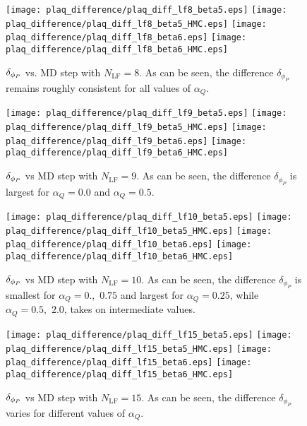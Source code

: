 \documentclass[../main.tex]{subfiles}
\begin{document}
%
\begin{figure}[htpb]\label{fig:plaq_diff_plots_lf8_beta5}
  \texttt{[image: plaq\_difference/plaq\_diff\_lf8\_beta5.eps]}
  \hfill
  \texttt{[image: plaq\_difference/plaq\_diff\_lf8\_beta5\_HMC.eps]}
  \texttt{[image: plaq\_difference/plaq\_diff\_lf8\_beta6.eps]}
  \hfill
  \texttt{[image: plaq\_difference/plaq\_diff\_lf8\_beta6\_HMC.eps]}
  \caption{${\delta_{\phi_{P}}}$ vs. MD step with $N_{\mathrm{LF}} = 8$. As can be seen, the difference $\delta_{\phi_{P}}$
    remains roughly consistent for all values of $\alpha_Q$.}
\end{figure}
%
\begin{figure}[htpb]\label{fig:plaq_diff_plots_lf9}
  \texttt{[image: plaq\_difference/plaq\_diff\_lf9\_beta5.eps]}
  \hfill
  \texttt{[image: plaq\_difference/plaq\_diff\_lf9\_beta5\_HMC.eps]}
  \texttt{[image: plaq\_difference/plaq\_diff\_lf9\_beta6.eps]}
  \hfill
  \texttt{[image: plaq\_difference/plaq\_diff\_lf9\_beta6\_HMC.eps]}
  \caption{${\delta_{\phi_{P}}}$ vs MD step with $N_{\mathrm{LF}} = 9$. As can be seen, the difference $\delta_{\phi_{P}}$ is
  largest for $\alpha_Q = 0.0$ and $\alpha_Q = 0.5$.}
\end{figure}
%
\begin{figure}[htpb]\label{fig:plaq_diff_plots_lf10}
  \texttt{[image: plaq\_difference/plaq\_diff\_lf10\_beta5.eps]}
  \hfill
  \texttt{[image: plaq\_difference/plaq\_diff\_lf10\_beta5\_HMC.eps]}
  \texttt{[image: plaq\_difference/plaq\_diff\_lf10\_beta6.eps]}
  \hfill
  \texttt{[image: plaq\_difference/plaq\_diff\_lf10\_beta6\_HMC.eps]}
  \caption{${\delta_{\phi_{P}}}$ vs MD step with $N_{\mathrm{LF}} = 10$. As can be seen, the difference $\delta_{\phi_{P}}$ is
    smallest for $\alpha_Q = 0.,\,\,0.75$ and largest for $\alpha_Q = 0.25$, while $\alpha_Q = 0.5,\,\,2.0$, takes on
  intermediate values.}
\end{figure}
%
\begin{figure}[htpb]\label{fig:plaq_diff_plots_lf15}
  \texttt{[image: plaq\_difference/plaq\_diff\_lf15\_beta5.eps]}
  \hfill
  \texttt{[image: plaq\_difference/plaq\_diff\_lf15\_beta5\_HMC.eps]}
  \texttt{[image: plaq\_difference/plaq\_diff\_lf15\_beta6.eps]}
  \hfill
  \texttt{[image: plaq\_difference/plaq\_diff\_lf15\_beta6\_HMC.eps]}
  \caption{${\delta_{\phi_{P}}}$ vs MD step with $N_{\mathrm{LF}} = 15$. As can be seen, the difference $\delta_{\phi_{P}}$
    varies for different values of $\alpha_Q$.}
\end{figure}
\end{document}
